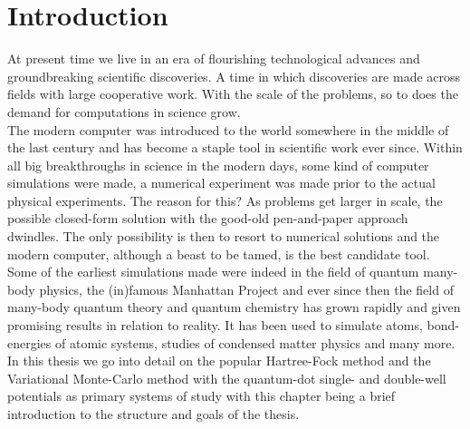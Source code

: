 \chapter{Introduction\label{chapter:1}}
    At present time we live in an era of flourishing technological advances and
    groundbreaking scientific discoveries. A time in which discoveries are made
    across fields with large cooperative work. With the scale of the problems,
    so to does the demand for computations in science grow. \\
    The modern computer was introduced to the world somewhere in the middle of
    the last century and has become a staple tool in scientific work ever
    since. Within all big breakthroughs in science in the modern days, some
    kind of computer simulations were made, a numerical experiment was made
    prior to the actual physical experiments. The reason for this? As problems
    get larger in scale, the possible closed-form solution with the good-old
    pen-and-paper approach dwindles. The only possibility is then to resort to
    numerical solutions and the modern computer, although a beast to be tamed,
    is the best candidate tool. \\
    Some of the earliest simulations made were indeed in the field of quantum
    many-body physics, the (in)famous Manhattan Project and ever since then the
    field of many-body quantum theory and quantum chemistry has grown rapidly
    and given promising results in relation to reality. It has been used to
    simulate atoms, bond-energies of atomic systems, studies of condensed
    matter physics and many more. In this thesis we go into detail on the
    popular Hartree-Fock method and the Variational Monte-Carlo method with the
    quantum-dot single- and double-well potentials as primary systems of study
    with this chapter being a brief introduction to the structure and goals of
    the thesis.

